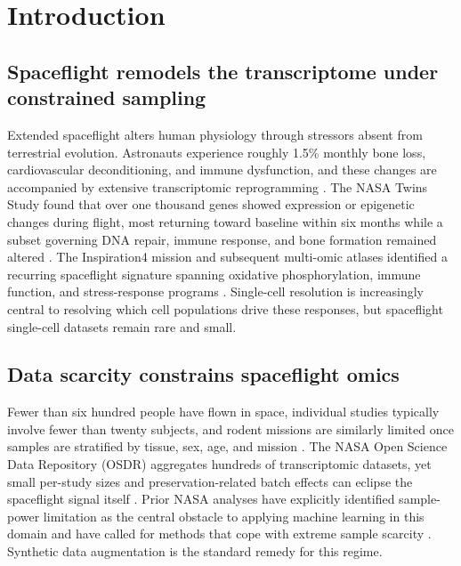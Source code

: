 \documentclass[11pt]{article}
\begin{document}
\section{Introduction}

\subsection{Spaceflight remodels the transcriptome under constrained sampling}
Extended spaceflight alters human physiology through stressors absent from terrestrial evolution. Astronauts experience roughly 1.5\% monthly bone loss, cardiovascular deconditioning, and immune dysfunction, and these changes are accompanied by extensive transcriptomic reprogramming \cite{twins}. The NASA Twins Study found that over one thousand genes showed expression or epigenetic changes during flight, most returning toward baseline within six months while a subset governing DNA repair, immune response, and bone formation remained altered \cite{twins}. The Inspiration4 mission and subsequent multi-omic atlases identified a recurring spaceflight signature spanning oxidative phosphorylation, immune function, and stress-response programs \cite{i4}. Single-cell resolution is increasingly central to resolving which cell populations drive these responses, but spaceflight single-cell datasets remain rare and small.

\subsection{Data scarcity constrains spaceflight omics}
Fewer than six hundred people have flown in space, individual studies typically involve fewer than twenty subjects, and rodent missions are similarly limited once samples are stratified by tissue, sex, age, and mission \cite{ilangovan,scott}. The NASA Open Science Data Repository (OSDR) aggregates hundreds of transcriptomic datasets, yet small per-study sizes and preservation-related batch effects can eclipse the spaceflight signal itself \cite{osdr}. Prior NASA analyses have explicitly identified sample-power limitation as the central obstacle to applying machine learning in this domain and have called for methods that cope with extreme sample scarcity \cite{scott,ilangovan}. Synthetic data augmentation is the standard remedy for this regime.
\end{document}
